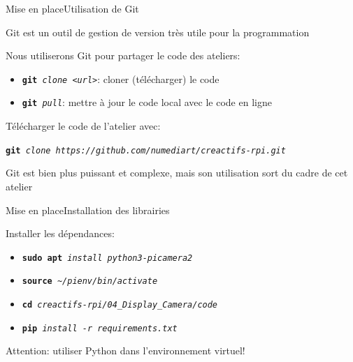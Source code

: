 \documentclass[
aspectratio=169 %
]{beamer}
\newcommand{\cmd}[1]{\texttt{\textbf{#1}}}
\newcommand{\args}[1]{\texttt{\textit{#1}}}
\begin{document}
\begin{frame}{Mise en place}{Utilisation de Git}

    Git est un outil de gestion de version très utile pour la
    programmation

    \bigskip
    Nous utiliserons Git pour partager le code des ateliers:
    \begin{itemize}
        \item \cmd{git}\args{ clone <url>}: cloner (télécharger) le code
        \item \cmd{git}\args{ pull}: mettre à jour le code local avec le code en
              ligne
    \end{itemize}

    \bigskip
    Télécharger le code de l'atelier avec:

    \cmd{git}\args{ clone https://github.com/numediart/creactifs-rpi.git}

    \bigskip
    \alert{Git est bien plus puissant et complexe, mais son utilisation sort
        du cadre de cet atelier}

\end{frame}

\begin{frame}{Mise en place}{Installation des librairies}

    Installer les dépendances:
    \begin{itemize}
        \item \cmd{sudo apt}\args{ install python3-picamera2}
        \item \cmd{source}\args{ \textasciitilde/pienv/bin/activate}
        \item \cmd{cd}\args{ creactifs-rpi/04\_Display\_Camera/code}
        \item \cmd{pip}\args{ install -r requirements.txt}
    \end{itemize}

    \bigskip
    \alert{Attention}: utiliser Python dans l'environnement virtuel!
\end{frame}
\end{document}
